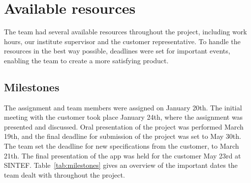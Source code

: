 \section{Available resources}
\label{sec:availResources}
The team had several available resources throughout the project, including work hours, our institute supervisor and the customer representative. To handle the resources in the best way possible, deadlines were set for important events, enabling the team to create a more satisfying product.

\subsection{Milestones}

The assignment and team members were assigned on January 20th. The initial meeting with the customer took place January 24th, where the assignment was presented and discussed. Oral presentation of the project was performed March 19th, and the final deadline for submission of the project was set to May 30th. The team set the deadline for new specifications from the customer, to March 21th. The final presentation of the app was held for the customer May 23rd at SINTEF.
Table~\ref{tab:milestones} gives an overview of the important dates the team dealt with throughout the project. 


